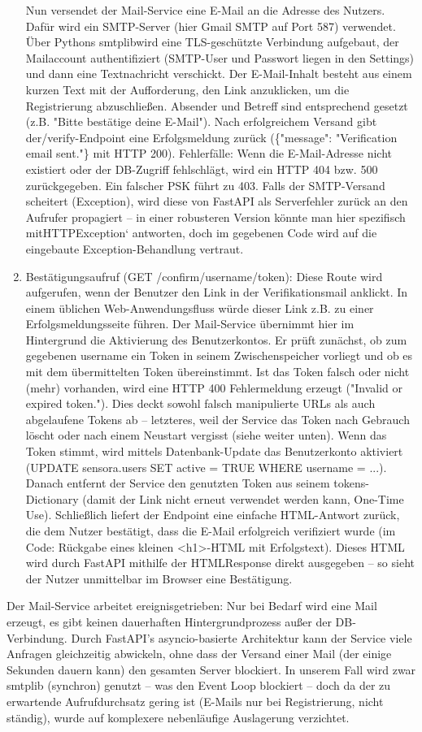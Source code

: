 \begin{enumerate}
    Nun versendet der Mail-Service eine E-Mail an die Adresse des Nutzers. Dafür wird ein SMTP-Server (hier Gmail SMTP auf Port 587) verwendet. Über Pythons smtplibwird eine TLS-geschützte Verbindung aufgebaut, der Mailaccount authentifiziert (SMTP-User und Passwort liegen in den Settings) und dann eine Textnachricht verschickt. Der E-Mail-Inhalt besteht aus einem kurzen Text mit der Aufforderung, den Link anzuklicken, um die Registrierung abzuschließen. Absender und Betreff sind entsprechend gesetzt (z.B. "Bitte bestätige deine E-Mail"). Nach erfolgreichem Versand gibt der/verify-Endpoint eine Erfolgsmeldung zurück (\{"message": "Verification email sent."\} mit HTTP 200). Fehlerfälle:
    Wenn die E-Mail-Adresse nicht existiert oder der DB-Zugriff fehlschlägt, wird ein HTTP 404 bzw. 500 zurückgegeben. Ein falscher PSK führt zu 403. Falls der SMTP-Versand scheitert (Exception), wird diese von FastAPI als Serverfehler zurück an den Aufrufer propagiert – in einer robusteren Version könnte man hier spezifisch mitHTTPException` antworten, doch im gegebenen Code wird auf die eingebaute Exception-Behandlung vertraut.
    \item Bestätigungsaufruf (GET /confirm/{username}/{token}): Diese Route wird aufgerufen, wenn der Benutzer den Link in der Verifikationsmail anklickt. In einem üblichen Web-Anwendungsfluss würde dieser Link z.B. zu einer Erfolgsmeldungsseite führen. Der Mail-Service übernimmt hier im Hintergrund die Aktivierung des Benutzerkontos. Er prüft zunächst, ob zum gegebenen username ein Token in seinem Zwischenspeicher vorliegt und ob es mit dem übermittelten Token übereinstimmt. Ist das Token falsch oder nicht (mehr) vorhanden, wird eine HTTP 400 Fehlermeldung erzeugt ("Invalid or expired token."). Dies deckt sowohl falsch manipulierte URLs als auch abgelaufene Tokens ab – letzteres, weil der Service das Token nach Gebrauch löscht oder nach einem Neustart vergisst (siehe weiter unten). Wenn das Token stimmt, wird mittels Datenbank-Update das Benutzerkonto aktiviert (UPDATE sensora.users SET active = TRUE WHERE username = ...). Danach entfernt der Service den genutzten Token aus seinem tokens-Dictionary (damit der Link nicht erneut verwendet werden kann, One-Time Use). Schließlich liefert der Endpoint eine einfache HTML-Antwort zurück, die dem Nutzer bestätigt, dass die E-Mail erfolgreich verifiziert wurde (im Code: Rückgabe eines kleinen <h1>-HTML mit Erfolgstext). Dieses HTML wird durch FastAPI mithilfe der HTMLResponse direkt ausgegeben – so sieht der Nutzer unmittelbar im Browser eine Bestätigung.
\end{enumerate}
Der Mail-Service arbeitet ereignisgetrieben: Nur bei Bedarf wird eine Mail erzeugt, es gibt keinen dauerhaften Hintergrundprozess außer der DB-Verbindung. Durch FastAPI’s asyncio-basierte Architektur \cite{fastAPI}kann der Service viele Anfragen gleichzeitig abwickeln, ohne dass der Versand einer Mail (der einige Sekunden dauern kann) den gesamten Server blockiert. In unserem Fall wird zwar smtplib (synchron) genutzt – was den Event Loop blockiert – doch da der zu erwartende Aufrufdurchsatz gering ist (E-Mails nur bei Registrierung, nicht ständig), wurde auf komplexere nebenläufige Auslagerung verzichtet.

